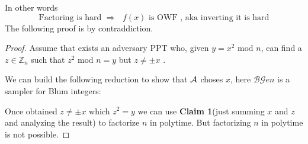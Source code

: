 In other words
\[
    \text{Factoring is hard } \Rightarrow \text{ $f(x)$ is OWF , aka inverting
    it is hard}
\]
The following proof is by contraddiction.
\begin{proof}
    Assume that exists an adversary PPT who, given $y=x^{2} \text{ mod } n$, can find a $z \in \mathbb{Z}_{n} $ such that $z^{2} \text{ mod } n=y$ but $z\neq \pm x$ .

    We can build the following reduction to show that $\mathcal{A}$ choses $x$, here $\mathcal{BG}en$ is a sampler for Blum integers:

    \begin{figure}[ht]
       \centering
       \sdinit{}
    \end{figure}
    
    Once obtained $z\neq \pm x$ which $z^{2}=y$ we can use \textbf{Claim 1}(just summing $x$ and $z$ and analyzing the result)  to factorize $n$ in polytime. But factorizing $n$ in polytime is not possible.
\end{proof}
